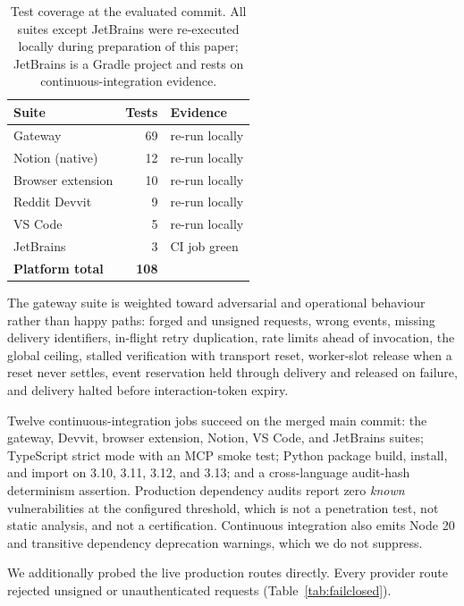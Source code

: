 \begin{table}[t]
\centering
\small
\caption{Test coverage at the evaluated commit. All suites except JetBrains were
re-executed locally during preparation of this paper; JetBrains is a Gradle project and
rests on continuous-integration evidence.}
\label{tab:tests}
\begin{tabular}{@{}lrl@{}}
\toprule
\textbf{Suite} & \textbf{Tests} & \textbf{Evidence} \\
\midrule
Gateway                & 69 & re-run locally \\
Notion (native)        & 12 & re-run locally \\
Browser extension      & 10 & re-run locally \\
Reddit Devvit          & \phantom{0}9 & re-run locally \\
VS Code                & \phantom{0}5 & re-run locally \\
JetBrains              & \phantom{0}3 & CI job green \\
\midrule
\textbf{Platform total} & \textbf{108} & \\
\bottomrule
\end{tabular}
\end{table}

The gateway suite is weighted toward adversarial and operational behaviour rather than
happy paths: forged and unsigned requests, wrong events, missing delivery identifiers,
in-flight retry duplication, rate limits ahead of invocation, the global ceiling, stalled
verification with transport reset, worker-slot release when a reset never settles, event
reservation held through delivery and released on failure, and delivery halted before
interaction-token expiry.

Twelve continuous-integration jobs succeed on the merged main commit: the gateway, Devvit,
browser extension, Notion, VS Code, and JetBrains suites; TypeScript strict mode with an
MCP smoke test; Python package build, install, and import on 3.10, 3.11, 3.12, and 3.13;
and a cross-language audit-hash determinism assertion. Production dependency audits report
zero \emph{known} vulnerabilities at the configured threshold, which is not a penetration
test, not static analysis, and not a certification. Continuous integration also emits Node
20 and transitive dependency deprecation warnings, which we do not suppress.

We additionally probed the live production routes directly. Every provider route rejected
unsigned or unauthenticated requests (Table~\ref{tab:failclosed}).

